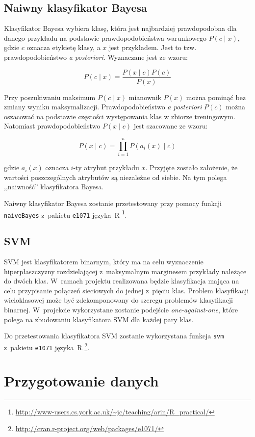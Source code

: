 \documentclass[a4paper, 12pt]{article}
\begin{document}
\subsection{Naiwny klasyfikator Bayesa}

Klasyfikator Bayesa wybiera klasę, która jest najbardziej prawdopodobna dla danego przykładu na 
podstawie prawdopodobieństwa
warunkowego $P(c \mid x)$, gdzie $c$ oznacza etykietę klasy, a $x$ jest przykładem. 
Jest to tzw. prawdopodobieństwo
\textit{a posteriori}. Wyznaczane jest ze wzoru:

$$ P(c \mid x) = \frac{P(x \mid c)P(c)}{P(x)} $$

Przy poszukiwaniu maksimum $P(c \mid x)$ mianownik $P(x)$ można pominąć bez zmiany wyniku 
maksymalizacji.
Prawdopodobieństwo \textit{a posteriori} $P(c)$ można oszacować na podstawie częstości 
występowania klas w zbiorze treningowym.
Natomiast prawdopodobieństwo $P(x \mid c)$ jest szacowane ze wzoru:

$$ P(x \mid c) = \prod_{i=1}^n P(a_i(x) \mid c)$$

gdzie $a_i(x)$ oznacza $i$-ty atrybut przykładu $x$.
Przyjęte zostało założenie, że wartości poszczególnych atrybutów są niezależne od siebie.
Na tym polega ,,naiwność'' klasyfikatora Bayesa.

Naiwny klasyfikator Bayesa zostanie przetestowany przy pomocy funkcji \texttt{naiveBayes} z~pakietu \texttt{e1071} języka~R
\footnote{\url{http://www-users.cs.york.ac.uk/~jc/teaching/arin/R_practical/}}.

\subsection{SVM}
SVM jest klasyfikatorem binarnym, który ma na celu wyznaczenie hiperpłaszczyzny rozdzielającej 
z~maksymalnym marginesem przykłady należące do dwóch klas. W~ramach projektu realizowana będzie 
klasyfikacja mająca na celu przypisanie połączeń sieciowych do jednej z~pięciu klas. 
Problem klasyfikacji wieloklasowej może być zdekomponowany do szeregu problemów klasyfikacji binarnej. 
W~projekcie wykorzystane zostanie podejście \textit{one-against-one}, 
które polega na zbudowaniu klasyfikatora SVM dla każdej pary klas. 

Do przetestowania klasyfikatora SVM zostanie wykorzystana funkcja \texttt{svm} z~pakietu 
\texttt{e1071} języka~R \footnote{\url{http://cran.r-project.org/web/packages/e1071/}}.

\section{Przygotowanie danych}
\end{document}
